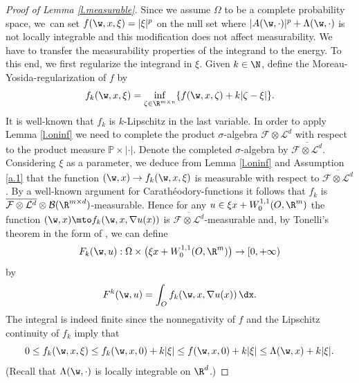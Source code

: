 \begin{proof}[Proof of Lemma \ref{l.measurable}]
Since we assume $\Omega$ to be a complete probability space, we~can set $f(\w,x,\xi)=|\xi|^p$ on the null set where $|A(\w,\cdot)|^p+\Lambda(\w,\cdot)$ is not locally integrable and this modification does not affect measurability. We have to transfer the measurability properties of the integrand to the energy. To this end, we first regularize the integrand in $\xi$. Given $k\in\N$, define the Moreau-Yosida-regularization of $f$ by
\begin{equation*}
f_k(\w,x,\xi)=\inf_{\zeta\in\R^{m\times n}}\{f(\w,x,\zeta)+k|\zeta-\xi|\}.
\end{equation*}
It is well-known that $f_k$ is $k$-Lipschitz in the last variable. In order to apply Lemma \ref{l.oninf} we need to complete the product $\sigma$-algebra $\mathcal{F}\otimes\mathcal{L}^d$ with respect to the product measure $\mathbb{P}\times |\cdot|$. Denote the completed $\sigma$-algebra by $\overline{\mathcal{F}\otimes\mathcal{L}^d}$. Considering $\xi$ as a parameter, we deduce from Lemma \ref{l.oninf} and Assumption \ref{a.1} that the function $(\w,x)\to f_k(\w,x,\xi)$ is measurable with respect to $\overline{\mathcal{F}\otimes\mathcal{L}^d}$. By a well-known argument for Carathéodory-functions it follows that $f_k$ is $\overline{\mathcal{F}\otimes\mathcal{L}^d}\otimes\mathcal{B}(\R^{m\times d})$-measurable. Hence for any $u\in \xi x+W_0^{1,1}(O,\R^m)$ the function $(\w,x)\mto f_k(\w,x,\nabla u(x))$ is $\overline{\mathcal{F}\otimes\mathcal{L}^d}$-measurable and, by Tonelli's theorem in the form of \cite[Th.\,1.121]{FoLe}, we can define
\[
F_k(\w,u):\Omega\times \bigl(\xi x+W_0^{1,1}(O,\R^m)\bigr)\to [0,+\infty)
\]
by
\begin{equation*}
F^k(\w,u)=\int_O f_k(\w,x,\nabla u(x))\,\dx.
\end{equation*}
The integral is indeed finite since the nonnegativity of $f$ and the Lipschitz continuity of $f_k$ imply that
\begin{equation}\label{eq:lineargrowth}
0\leq f_k(\w,x,\xi)\leq f_k(\w,x,0)+k|\xi|\leq f(\w,x,0)+k|\xi|\leq \Lambda(\w,x)+k|\xi|.
\end{equation}
(Recall that $\Lambda(\w,\cdot)$ is locally integrable on $\R^d$.)

\end{proof}
